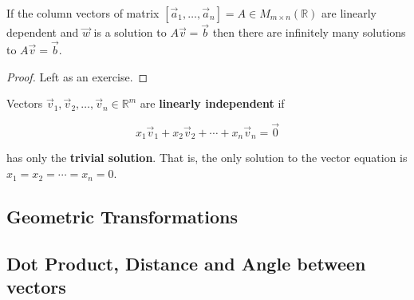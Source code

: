 \begin{proposition}\label{prop:zero_dependent} If the column vectors of matrix $[\vec{a}_1, \ldots, \vec{a}_n]=A \in M_{m\times n}(\mathbb{R})$ are linearly dependent and $\vec{w}$ is a solution to $A\vec{v}=\vec{b}$ then there are infinitely many solutions to $A\vec{v}=\vec{b}$.
\end{proposition}
\begin{proof}
Left as an exercise.
\end{proof}

\begin{definition}
Vectors $\vec{v}_1, \vec{v}_2, \ldots, \vec{v}_n \in \mathbb{R}^m$ are \textbf{linearly independent} if 

$$x_1\vec{v}_1+x_2\vec{v}_2+\cdots + x_n \vec{v}_n=\vec{0}$$

has only the \textbf{trivial solution}. That is, the only solution to the vector equation is $x_1=x_2=\cdots=x_n=0$.  
\end{definition}

\subsection{Geometric Transformations}

\subsection{Dot Product, Distance and Angle between vectors}

